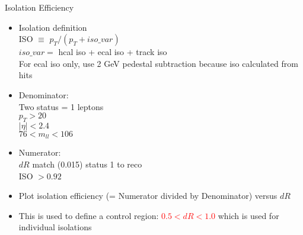 \documentclass{beamer}
\begin{document}
\begin{frame}{Isolation Efficiency}
  \begin{itemize}

  \item Isolation definition\\ ISO $\equiv$ $p_T/(p_T + iso\_var)$\\ \footnotesize{ $iso\_var =$ hcal iso + ecal iso + track iso} \\ For ecal iso only, use 2 GeV pedestal subtraction because iso calculated from hits
  \item Denominator:\\ Two status = 1 leptons \\ $p_T > 20$\\ $|\eta| < 2.4$\\ $76 < m_{ll} < 106$
  \item Numerator:\\ $dR$ match (0.015) status 1 to reco\\ ISO $> 0.92$
  \item Plot isolation efficiency (= Numerator divided by Denominator) versus $dR$
  \item This is used to define a control region: \textcolor{red}{$0.5 < dR < 1.0$} which is used for individual isolations
  \end{itemize}


\end{frame}
\end{document}
